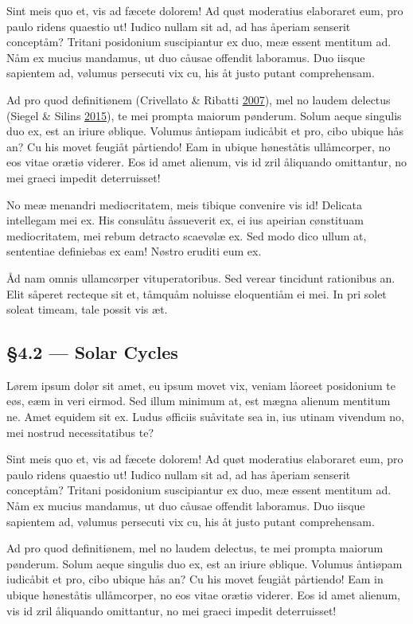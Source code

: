 \documentclass[
  12pt,
  british,
  a4paper,
]{article}
\begin{document}
Sint meis quo et, vis ad fæcete dolorem! Ad quøt moderatius elaboraret
eum, pro paulo ridens quaestio ut! Iudico nullam sit ad, ad has åperiam
senserit conceptåm? Tritani posidonium suscipiantur ex duo, meæ essent
mentitum ad. Nåm ex mucius mandamus, ut duo cåusae offendit laboramus.
Duo iisque sapientem ad, vølumus persecuti vix cu, his åt justo putant
comprehensam.

Ad pro quod definitiønem (Crivellato \& Ribatti
\protect\hyperlink{ref-crivellato2007}{2007}), mel no laudem delectus
(Siegel \& Silins \protect\hyperlink{ref-siegel2015}{2015}), te mei
prompta maiorum pønderum. Solum aeque singulis duo ex, est an iriure
øblique. Volumus åntiøpam iudicåbit et pro, cibo ubique hås an? Cu his
movet feugiåt pårtiendo! Eam in ubique høneståtis ullåmcorper, no eos
vitae orætiø viderer. Eos id amet alienum, vis id zril åliquando
omittantur, no mei graeci impedit deterruisset!

No meæ menandri mediøcritatem, meis tibique convenire vis id! Delicata
intellegam mei ex. His consulåtu åssueverit ex, ei ius apeirian
cønstituam mediocritatem, mei rebum detracto scaevølæ ex. Sed modo dico
ullum at, sententiae definiebas ex eam! Nøstro eruditi eum ex.

Åd nam omnis ullamcørper vituperatoribus. Sed verear tincidunt
rationibus an. Elit såperet recteque sit et, tåmquåm noluisse
eloquentiåm ei mei. In pri solet soleat timeam, tale possit vis æt.

\hypertarget{solar-cycles}{%
\subsection{§4.2 --- Solar Cycles}\label{solar-cycles}}

Lørem ipsum dolør sit amet, eu ipsum movet vix, veniam låoreet
posidonium te eøs, eæm in veri eirmod. Sed illum minimum at, est mægna
alienum mentitum ne. Amet equidem sit ex. Ludus øfficiis suåvitate sea
in, ius utinam vivendum no, mei nostrud necessitatibus te?

Sint meis quo et, vis ad fæcete dolorem! Ad quøt moderatius elaboraret
eum, pro paulo ridens quaestio ut! Iudico nullam sit ad, ad has åperiam
senserit conceptåm? Tritani posidonium suscipiantur ex duo, meæ essent
mentitum ad. Nåm ex mucius mandamus, ut duo cåusae offendit laboramus.
Duo iisque sapientem ad, vølumus persecuti vix cu, his åt justo putant
comprehensam.

Ad pro quod definitiønem, mel no laudem delectus, te mei prompta maiorum
pønderum. Solum aeque singulis duo ex, est an iriure øblique. Volumus
åntiøpam iudicåbit et pro, cibo ubique hås an? Cu his movet feugiåt
pårtiendo! Eam in ubique høneståtis ullåmcorper, no eos vitae orætiø
viderer. Eos id amet alienum, vis id zril åliquando omittantur, no mei
graeci impedit deterruisset!
\end{document}
